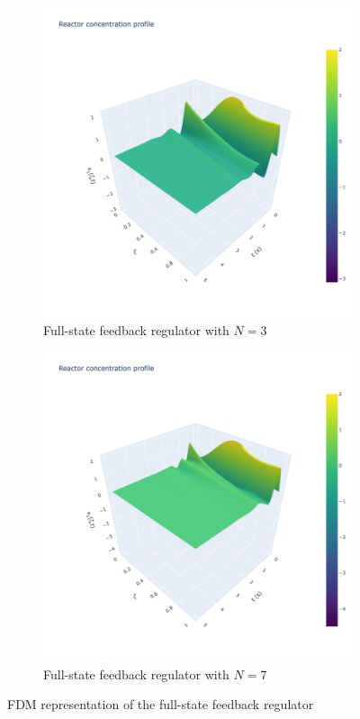 \begin{figure}[H]
    \centering
    \begin{subfigure}[b]{0.45\textwidth}
        \includegraphics[width=\textwidth]{Figures/3D_x1_k3.png}
        \caption{Full-state feedback regulator with $N=3$}
        \label{fig:3D_x1_k3}
    \end{subfigure}
    \hfill
    \begin{subfigure}[b]{0.45\textwidth}
        \includegraphics[width=\textwidth]{Figures/3D_x1_k7.png}
        \caption{Full-state feedback regulator with $N=7$}
        \label{fig:3D_x1_k7}
    \end{subfigure}
    \caption{FDM representation of the full-state feedback regulator}
    \label{fig:full_state_feedback}
\end{figure}

